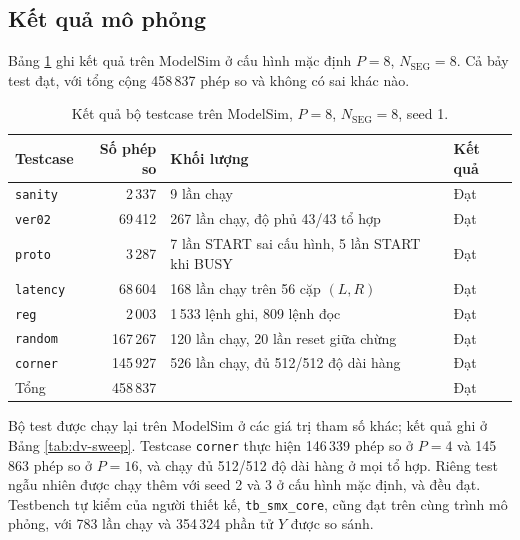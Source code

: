\subsection{Kết quả mô phỏng}
\label{sec:sim-res}

Bảng \ref{tab:dv-results} ghi kết quả trên ModelSim ở cấu hình mặc định $P = 8$, $N_{\text{SEG}} = 8$. Cả bảy test đạt, với tổng cộng 458\,837 phép so và không có sai khác nào.

\begin{table}[htbp]
\centering
\small
\begin{tabular}{lrp{7.4cm}l}
\toprule
Testcase & Số phép so & Khối lượng & Kết quả \\
\midrule
\texttt{sanity}  &   2\,337 & 9 lần chạy & Đạt \\
\texttt{ver02}   &  69\,412 & 267 lần chạy, độ phủ 43/43 tổ hợp & Đạt \\
\texttt{proto}   &   3\,287 & 7 lần START sai cấu hình, 5 lần START khi BUSY & Đạt \\
\texttt{latency} &  68\,604 & 168 lần chạy trên 56 cặp $(L, R)$ & Đạt \\
\texttt{reg}     &   2\,003 & 1\,533 lệnh ghi, 809 lệnh đọc & Đạt \\
\texttt{random}  & 167\,267 & 120 lần chạy, 20 lần reset giữa chừng & Đạt \\
\texttt{corner}  & 145\,927 & 526 lần chạy, đủ 512/512 độ dài hàng & Đạt \\
\midrule
Tổng             & 458\,837 & & Đạt \\
\bottomrule
\end{tabular}
\caption{Kết quả bộ testcase trên ModelSim, $P = 8$, $N_{\text{SEG}} = 8$, seed 1.}
\label{tab:dv-results}
\end{table}

Bộ test được chạy lại trên ModelSim ở các giá trị tham số khác; kết quả ghi ở Bảng \ref{tab:dv-sweep}. Testcase \texttt{corner} thực hiện 146\,339 phép so ở $P = 4$ và 145\,863 phép so ở $P = 16$, và chạy đủ 512/512 độ dài hàng ở mọi tổ hợp. Riêng test ngẫu nhiên được chạy thêm với seed 2 và 3 ở cấu hình mặc định, và đều đạt. Testbench tự kiểm của người thiết kế, \texttt{tb\_smx\_core}, cũng đạt trên cùng trình mô phỏng, với 783 lần chạy và 354\,324 phần tử $Y$ được so sánh.

